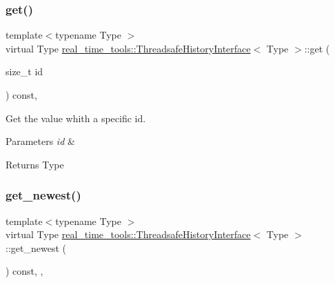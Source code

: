 \subsubsection{\texorpdfstring{get()}{get()}}
{\footnotesize\ttfamily template$<$typename Type $>$ \\
virtual Type \hyperlink{classreal__time__tools_1_1ThreadsafeHistoryInterface}{real\+\_\+time\+\_\+tools\+::\+Threadsafe\+History\+Interface}$<$ Type $>$\+::get (\begin{DoxyParamCaption}\item[{size\+\_\+t}]{id }\end{DoxyParamCaption}) const\hspace{0.3cm}{\ttfamily [private]}, {}}



Get the value whith a specific id. 


\begin{DoxyParams}{Parameters}
{\em id} & \\
\hline
\end{DoxyParams}
\begin{DoxyReturn}{Returns}
Type 
\end{DoxyReturn}
\mbox{\label{classreal__time__tools_1_1ThreadsafeHistoryInterface_a4a3264f37257d8cd48e4d6975ffdf9d7}} 
\subsubsection{\texorpdfstring{get\+\_\+newest()}{get\_newest()}}
{\footnotesize\ttfamily template$<$typename Type $>$ \\
virtual Type \hyperlink{classreal__time__tools_1_1ThreadsafeHistoryInterface}{real\+\_\+time\+\_\+tools\+::\+Threadsafe\+History\+Interface}$<$ Type $>$\+::get\+\_\+newest (\begin{DoxyParamCaption}{ }\end{DoxyParamCaption}) const\hspace{0.3cm}{\ttfamily [inline]}, {\ttfamily [private]}, {\ttfamily [virtual]}}



